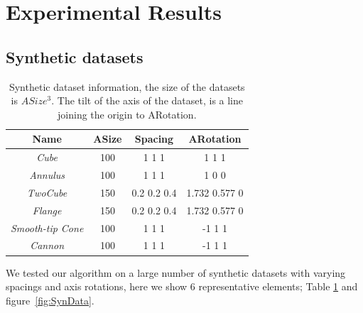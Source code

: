 \section{Experimental Results}
\subsection{Synthetic datasets}
\begin{table}[htb]
	\centering
	\begin{tabular}{|c c c c|} 
		\hline
		Name & ASize & Spacing & ARotation \\ [0.5ex] 
		\hline 
		\textit{Cube}  & 100 & 1 1 1 & 1 1 1\\
		\textit{Annulus} & 100 & 1 1 1 &  1 0 0\\ 
		\textit{TwoCube} & 150 & 0.2 0.2 0.4 &  1.732 0.577 0\\ 
		\textit{Flange} & 150 & 0.2 0.2 0.4 &  1.732 0.577 0\\ 
        \textit{Smooth-tip Cone} & 100 & 1 1 1 &  -1 1 1\\ 
        \textit{Cannon} & 100 & 1 1 1 &  -1 1 1\\ 
		\hline
	\end{tabular}
	\caption{Synthetic dataset information, the size of the datasets is $ASize^3$. The tilt of the axis of the dataset, is a line joining the origin to ARotation.}
	\label{table:SynDataInfo}
\end{table}
We tested our algorithm on a large number of synthetic datasets with varying spacings and axis rotations, here we show 6 representative elements; Table \ref{table:SynDataInfo} and figure~\ref{fig:SynData}.

